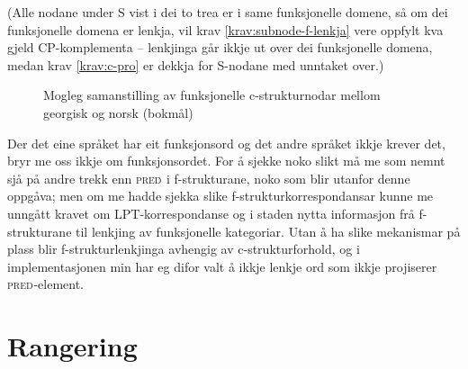 \documentclass[12pt,a4paper,oneside,draft]{report}
\newcommand{\F}[2]{\textsc{#1}\ensuremath{_{#2}}}
\newcommand{\PRED}{\F{pred}{}}
\begin{document}
(Alle nodane under S vist i dei to trea er i same funksjonelle domene,
 så om dei funksjonelle domena er lenkja, vil krav
 \ref{krav:subnode-f-lenkja} vere oppfylt kva gjeld CP-komplementa --
 lenkjinga går ikkje ut over dei funksjonelle domena, medan krav
 \ref{krav:c-pro} er dekkja for S-nodane med unntaket over.)

  \begin{figure}[htp]
   \centering
  
  \caption{Mogleg samanstilling av funksjonelle c-strukturnodar mellom georgisk og norsk (bokmål)}
   \label{fig:fnord}
  \end{figure}

Der det eine språket har eit funksjonsord og det andre språket ikkje
 krever det, bryr me oss ikkje om funksjonsordet. For å sjekke noko
 slikt må me som nemnt sjå på andre trekk enn \PRED{} i f-strukturane,
 noko som blir utanfor denne oppgåva; men om me hadde sjekka slike
 f-strukturkorrespondansar kunne me unngått kravet om
 LPT-korrespondanse og i staden nytta informasjon frå f-strukturane
 til lenkjing av funksjonelle kategoriar. Utan å ha slike mekanismar
 på plass blir f-strukturlenkjinga avhengig av c-strukturforhold, og i
 implementasjonen min har eg difor valt å ikkje lenkje ord som ikkje
 projiserer \PRED{}-element.

\section{Rangering}
\label{sec-3.8}

   \label{SEC:rangering}
\end{document}
